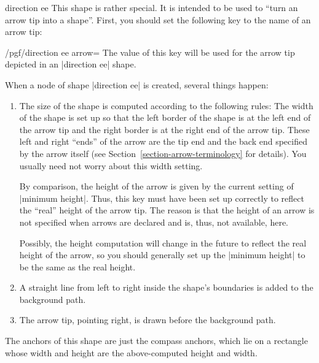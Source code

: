 \begin{shape}{direction ee}
    This shape is rather special. It is intended to be used to ``turn an arrow
    tip into a shape''. First, you should set the following key to the name of
    an arrow tip:
    \begin{key}{/pgf/direction ee arrow=}
        The value of this key will be used for the arrow tip depicted in an
        |direction ee| shape.
    \end{key}
    When a node of shape |direction ee| is created, several things happen:
    \begin{enumerate}
        \item The size of the shape is computed according to the following
            rules: The width of the shape is set up so that the left border of
            the shape is at the left end of the arrow tip and the right border
            is at the right end of the arrow tip. These left and right ``ends''
            of the arrow are the tip end and the back end specified by the
            arrow itself (see Section~\ref{section-arrow-terminology} for
            details). You usually need not worry about this width setting.

            By comparison, the height of the arrow is given by the current
            setting of |minimum height|. Thus, this key must have been set up
            correctly to reflect the ``real'' height of the arrow tip. The
            reason is that the height of an arrow is not specified when arrows
            are declared and is, thus, not available, here.

            Possibly, the height computation will change in the future to
            reflect the real height of the arrow, so you should generally set
            up the |minimum height| to be the same as the real height.
        \item A straight line from left to right inside the shape's boundaries
            is added to the background path.
        \item The arrow tip, pointing right, is drawn before the background
            path.
    \end{enumerate}
    The anchors of this shape are just the compass anchors, which lie on a
    rectangle whose width and height are the above-computed height and width.
\begin{codeexample}[preamble={\usetikzlibrary{circuits.ee.IEC}}]
\end{codeexample}


\end{shape}
